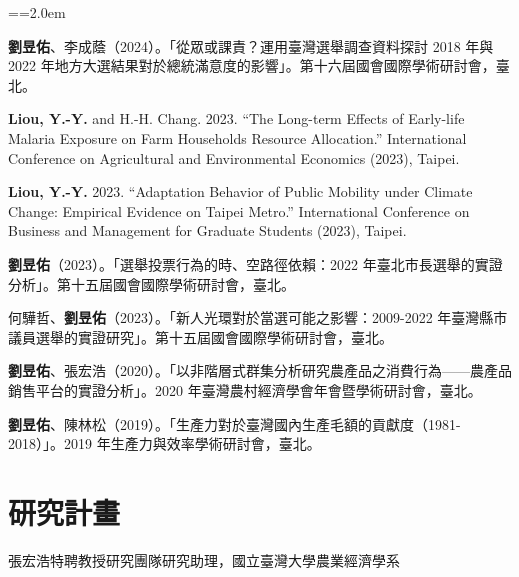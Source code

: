 \documentclass[11pt,letterpaper]{article}
\newenvironment{hanglist}{\par\setlength{\parindent}{0pt}\everypar={\hangindent=2.0em\hangafter=1}}{\par}
\begin{document}
\begin{hanglist}

\textbf{劉昱佑}、李成蔭（2024）。「從眾或課責？運用臺灣選舉調查資料探討
2018 年與 2022
年地方大選結果對於總統滿意度的影響」。第十六屆國會國際學術研討會，臺北。

\textbf{Liou, Y.-Y.} and H.-H. Chang. 2023. ``The
Long-term Effects of Early-life Malaria Exposure on Farm
Households\textquotesingle{} Resource Allocation.'' International
Conference on Agricultural and Environmental Economics (2023), Taipei.

\textbf{Liou, Y.-Y.} 2023. ``Adaptation Behavior
of Public Mobility under Climate Change: Empirical Evidence on Taipei
Metro.'' International Conference on Business and Management for
Graduate Students (2023), Taipei.

\textbf{劉昱佑}（2023）。「選舉投票行為的時、空路徑依賴：2022
年臺北市長選舉的實證分析」。第十五屆國會國際學術研討會，臺北。

何驊哲、\textbf{劉昱佑}（2023）。「新人光環對於當選可能之影響：2009-2022
年臺灣縣市議員選舉的實證研究」。第十五屆國會國際學術研討會，臺北。

\textbf{劉昱佑}、張宏浩（2020）。「以非階層式群集分析研究農產品之消費行為------農產品銷售平台的實證分析」。2020
年臺灣農村經濟學會年會暨學術研討會，臺北。

\textbf{劉昱佑}、陳林松（2019）。「生產力對於臺灣國內生產毛額的貢獻度（1981-2018）」。2019
年生產力與效率學術研討會，臺北。

\end{hanglist}

\section{研究計畫}\label{ux7814ux7a76ux8a08ux756b}

張宏浩特聘教授研究團隊研究助理，國立臺灣大學農業經濟學系
\end{document}
